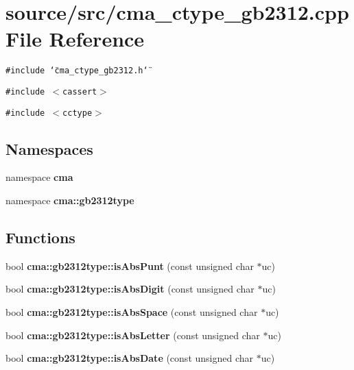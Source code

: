\section{source/src/cma\_\-ctype\_\-gb2312.cpp File Reference}
\label{cma__ctype__gb2312_8cpp}
{\tt \#include \char`\"{}cma\_\-ctype\_\-gb2312.h\char`\"{}}\par
{\tt \#include $<$cassert$>$}\par
{\tt \#include $<$cctype$>$}\par
\subsection*{Namespaces}
\begin{CompactItemize}
\item 
namespace \textbf{cma}
\item 
namespace \textbf{cma::gb2312type}
\end{CompactItemize}
\subsection*{Functions}
\begin{CompactItemize}
\item 
bool {\bf cma::gb2312type::isAbsPunt} (const unsigned char $\ast$uc)
\item 
bool {\bf cma::gb2312type::isAbsDigit} (const unsigned char $\ast$uc)
\item 
bool {\bf cma::gb2312type::isAbsSpace} (const unsigned char $\ast$uc)
\item 
bool {\bf cma::gb2312type::isAbsLetter} (const unsigned char $\ast$uc)
\item 
bool {\bf cma::gb2312type::isAbsDate} (const unsigned char $\ast$uc)
\end{CompactItemize}
